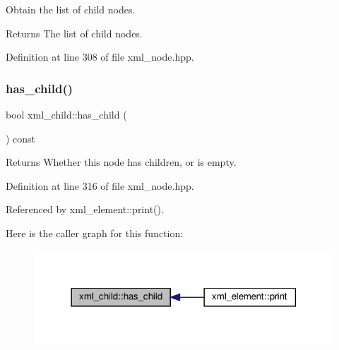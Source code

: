 Obtain the list of child nodes. 

\begin{DoxyReturn}{Returns}
The list of child nodes. 
\end{DoxyReturn}


Definition at line 308 of file xml\+\_\+node.\+hpp.

\mbox{\label{classxml__child_a31f81ff44aa268c1886fc9805f5c0bdd}} 
\subsubsection{\texorpdfstring{has\+\_\+child()}{has\_child()}}
{\footnotesize\ttfamily bool xml\+\_\+child\+::has\+\_\+child (\begin{DoxyParamCaption}{ }\end{DoxyParamCaption}) const\hspace{0.3cm}{\ttfamily [inline]}}

\begin{DoxyReturn}{Returns}
Whether this node has children, or is empty. 
\end{DoxyReturn}


Definition at line 316 of file xml\+\_\+node.\+hpp.



Referenced by xml\+\_\+element\+::print().

Here is the caller graph for this function\+:
\nopagebreak
\begin{figure}[H]
\begin{center}
\leavevmode
\includegraphics[width=318pt]{d7/df9/classxml__child_a31f81ff44aa268c1886fc9805f5c0bdd_icgraph}
\end{center}
\end{figure}
\mbox{\label{classxml__child_a9a8f42eaeaec40f4cb26582da2bcf61d}} 
